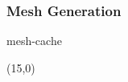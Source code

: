 \documentclass[aspectratio=169,table]{beamer}
\begin{document}
\begin{frame}
    \frametitle{Mesh Generation}
    {
        \centering
        \vspace{3em}
        {mesh-cache}
        \tikzexternaldisable
    }
    \begin{textblock}{3}(15,0)
    \end{textblock}%
\end{frame}
\end{document}
